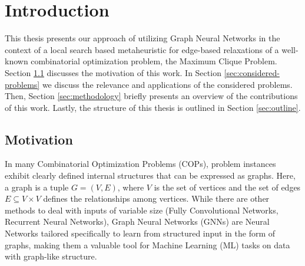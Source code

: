 \documentclass[draft,final]{vutinfth} %
\begin{document}
\frontmatter %

\addstatementpage

\begin{danksagung*}
\end{danksagung*}

\begin{acknowledgements*}
\end{acknowledgements*}

\begin{kurzfassung}
\end{kurzfassung}

\begin{abstract}
\end{abstract}


\tableofcontents %

\mainmatter

\chapter{Introduction}

This thesis presents our approach of utilizing Graph Neural Networks in the context of a local search based metaheuristic for edge-based relaxations of a well-known combinatorial optimization problem, the Maximum Clique Problem. Section \ref{sec:motivation} discusses the motivation of this work. In Section \ref{sec:considered-problems} we discuss the relevance and applications of the considered problems. Then, Section \ref{sec:methodology} briefly presents an overview of the contributions of this work. Lastly, the structure of this thesis is outlined in Section \ref{sec:outline}.

\section{Motivation}\label{sec:motivation}
In many Combinatorial Optimization Problems (COPs), problem instances exhibit clearly defined internal structures that can be expressed as graphs. Here, a graph is a tuple $G = (V, E)$, where $V$ is the set of vertices and the set of edges $E \subseteq V \times V$ defines the relationships among vertices. While there are other methods to deal with inputs of variable size (Fully Convolutional Networks, Recurrent Neural Networks), Graph Neural Networks (GNNs) are Neural Networks tailored specifically to learn from structured input in the form of graphs, making them a valuable tool for Machine Learning (ML) tasks on data with graph-like structure.   
\end{document}
